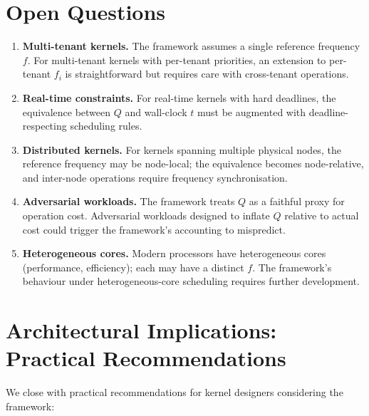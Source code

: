 \documentclass[twocolumn,11pt,a4paper]{article}
\newcommand{\Qweight}{Q}
\begin{document}
\section{Open Questions}
\label{sec:open}

\begin{enumerate}[nosep,leftmargin=*]
\item \textbf{Multi-tenant kernels.} The framework assumes a single reference frequency $f$. For multi-tenant kernels with per-tenant priorities, an extension to per-tenant $f_i$ is straightforward but requires care with cross-tenant operations.
\item \textbf{Real-time constraints.} For real-time kernels with hard deadlines, the equivalence between $\Qweight$ and wall-clock $t$ must be augmented with deadline-respecting scheduling rules.
\item \textbf{Distributed kernels.} For kernels spanning multiple physical nodes, the reference frequency may be node-local; the equivalence becomes node-relative, and inter-node operations require frequency synchronisation.
\item \textbf{Adversarial workloads.} The framework treats $\Qweight$ as a faithful proxy for operation cost. Adversarial workloads designed to inflate $\Qweight$ relative to actual cost could trigger the framework's accounting to mispredict.
\item \textbf{Heterogeneous cores.} Modern processors have heterogeneous cores (performance, efficiency); each may have a distinct $f$. The framework's behaviour under heterogeneous-core scheduling requires further development.
\end{enumerate}

\section{Architectural Implications: Practical Recommendations}
\label{sec:recommendations}

We close with practical recommendations for kernel designers considering the framework:
\end{document}
